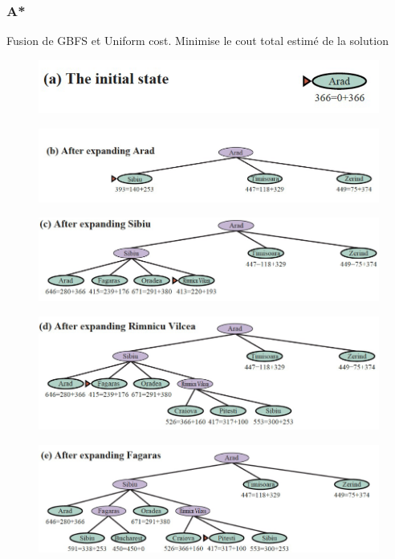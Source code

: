 		\subsubsection{A*}
		Fusion de GBFS et Uniform cost. Minimise le cout total estimé de la solution
		
		\begin{figure}[H]
			\centering
			\includegraphics[width=\textwidth]{img/A.png}
		\end{figure}
		\begin{figure}[H]
			\centering
			\includegraphics[width=\textwidth]{img/A1.png}
		\end{figure}\begin{figure}[H]
			\centering
			\includegraphics[width=\textwidth]{img/A2.png}
		\end{figure}\begin{figure}[H]
			\centering
			\includegraphics[width=\textwidth]{img/A3.png}
		\end{figure}\begin{figure}[H]
			\centering
			\includegraphics[width=\textwidth]{img/A4.png}

\end{figure}
